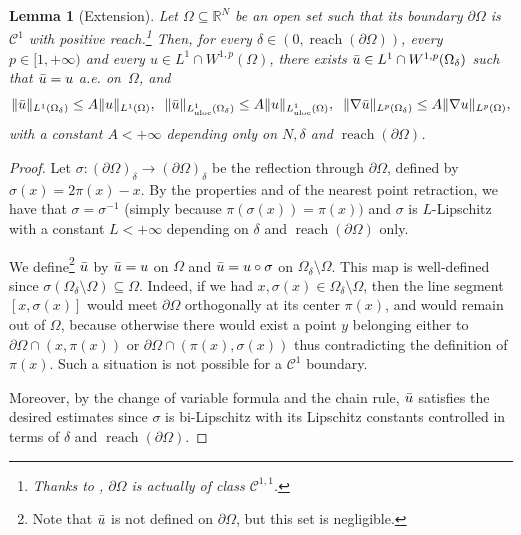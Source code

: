 \documentclass[10pt]{amsart}
\theoremstyle{plain}
\newtheorem{lemma}[theorem]{Lemma}
\theoremstyle{definition}
\newcommand{\R}{\mathbb{R}}
\newcommand{\Cspace}{\mathscr{C}}
\newcommand{\uloc}{L^1_\mathrm{uloc}}
\DeclarePairedDelimiter{\norm}{\lVert}{\rVert}
\DeclareMathOperator{\reach}{reach}
\begin{document}
\begin{lemma}[Extension]\label{lemmaExtension}
Let \(\Omega\subseteq\R^N\) be an open set such that its boundary \(\partial\Omega\) is~\(\Cspace^1\) with positive reach.\footnote{Thanks to \cite[Rem.\,4.20]{federerCurvatureMeasures1959}, $\partial \Omega$ is actually of class $\Cspace^{1,1}$.} Then, for every \(\delta\in (0,\reach(\partial\Omega))\), every \(p\in [1,+\infty)\) and every \(u\in L^1\cap W^{1,p}(\Omega)\), there exists \(\Bar{u}\in L^1\cap W^{1,p}(\Omega_\delta)\) such that \(\Bar{u}=u\) a.e. on~\(\Omega\), and
\[
\norm{\Bar{u}}_{L^1(\Omega_\delta)}\leq A \norm{u}_{L^1(\Omega)},
\;\;
\norm{\Bar{u}}_{\uloc({\Omega}_\delta)}\leq A \norm{u}_{\uloc(\Omega)},
\;\;
\norm{\nabla\Bar{u}}_{L^p(\Omega_\delta)}\leq A\norm{\nabla u}_{L^p(\Omega)},
\]
with a constant \(A<+\infty\) depending only on \(N,\delta\) and \(\reach(\partial\Omega)\).
\end{lemma}
\begin{proof}
Let \(\sigma:(\partial\Omega)_\delta\to (\partial\Omega)_\delta\) be the reflection through \(\partial\Omega\), defined by \(\sigma(x)=2\pi(x)-x\). By the properties  and  of the nearest point retraction, we have that \(\sigma=\sigma^{-1}\) (simply because $\pi(\sigma(x)) = \pi(x))$ and $\sigma$ is \(L\)-Lipschitz with a constant \(L<+\infty\) depending on \(\delta\) and \(\reach(\partial\Omega)\) only.

We define\footnote{Note that \(\Bar{u}\) is not defined on \(\partial\Omega\), but this set is negligible.} \(\Bar{u}\) by \(\Bar{u}=u\) on \(\Omega\) and \(\Bar{u}=u\circ\sigma\) on \(\Omega_\delta\setminus{\Omega}\). This map is well-defined since \(\sigma(\Omega_\delta\setminus{\Omega})\subseteq\Omega\). Indeed, if we had \(x,\sigma(x)\in\Omega_\delta\setminus{\Omega}\), then the line segment \([x,\sigma(x)]\) would meet \(\partial\Omega\) orthogonally at its center \(\pi(x)\), and would remain out of \({\Omega}\), because otherwise there would exist a point $y$ belonging either to $\partial \Omega \cap (x,\pi(x))$ or $\partial \Omega \cap (\pi(x),\sigma(x))$ thus contradicting the definition of $\pi(x)$. Such a situation is not possible for a \(\Cspace^1\) boundary.

Moreover, by the change of variable formula and the chain rule, \(\Bar{u}\) satisfies the desired estimates since \(\sigma\) is bi-Lipschitz with its Lipschitz constants controlled in terms of \(\delta\) and \(\reach(\partial\Omega)\).
\end{proof}
\end{document}
